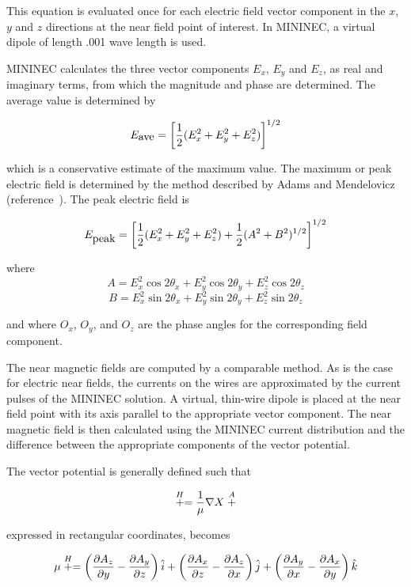 \documentclass[12pt]{article}
\begin{document}
This equation is evaluated once for each electric field vector component
in the $x$, $y$ and $z$ directions at the near field point of interest.
In MININEC, a virtual dipole of length .001 wave length is used.

MININEC calculates the three vector components $E_x$, $E_y$ and $E_z$,
as real and imaginary terms, from which the magnitude and phase are
determined. The average value is determined by

\begin{equation}
E_{\mbox{ave}} = \left[\frac{1}{2}(E_x^2+E_y^2+E_z^2)\right]^{1/2}
\label{eq34}
\end{equation}

which is a conservative estimate of the maximum value. The maximum or
peak electric field is determined by the method described by Adams and
Mendelovicz (reference~\cite{r13}). The peak electric field is

\begin{equation}
E_{\mbox{peak}} = \left[\frac{1}{2}(E_x^2+E_y^2+E_z^2)
                +\frac{1}{2}(A^2+B^2)^{1/2} \right]^{1/2}
\label{eq35}
\end{equation}

where
\[ A = E_x^2\cos 2\theta_x + E_y^2\cos 2\theta_y + E_z^2\cos 2\theta_z
\]
\[ B = E_x^2\sin 2\theta_x + E_y^2\sin 2\theta_y + E_z^2\sin 2\theta_z
\]

and where $O_x$, $O_y$, and $O_z$ are the phase angles for the
corresponding field component.

The near magnetic fields are computed by a comparable method. As is the
case for electric near fields, the currents on the wires are
approximated by the current pulses of the MININEC solution. A virtual,
thin-wire dipole is placed at the near field point with its axis
parallel to the appropriate vector component. The near magnetic field is
then calculated using the MININEC current distribution and the
difference between the appropriate components of the vector potential.

The vector potential is generally defined such that

\begin{equation}
\stackrel{H}{+} = \frac{1}{\mu}\nabla X\stackrel{A}{+}
\label{eq36}
\end{equation}

expressed in rectangular coordinates, becomes

\begin{equation}
\mu\stackrel{H}{+} =
\left(\frac{\partial A_z}{\partial y} - \frac{\partial A_y}{\partial z}\right)
\hat{i} +
\left(\frac{\partial A_x}{\partial z} - \frac{\partial A_z}{\partial x}\right)
\hat{j}+
\left(\frac{\partial A_y}{\partial x} - \frac{\partial A_x}{\partial y}\right)
\hat{k}
\label{eq37}
\end{equation}
\end{document}
